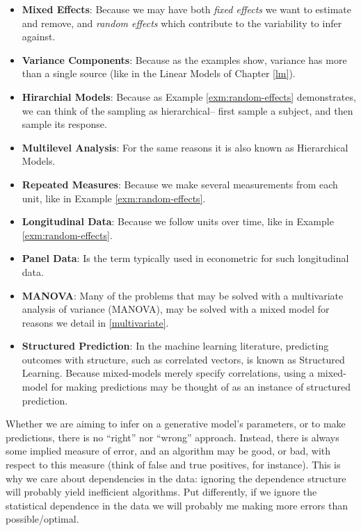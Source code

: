 \documentclass[]{book}
\theoremstyle{definition}
\theoremstyle{definition}
\theoremstyle{definition}
\theoremstyle{remark}
\begin{document}
\begin{itemize}
\item
  \textbf{Mixed Effects}: Because we may have both \emph{fixed effects}
  we want to estimate and remove, and \emph{random effects} which
  contribute to the variability to infer against.
\item
  \textbf{Variance Components}: Because as the examples show, variance
  has more than a single source (like in the Linear Models of Chapter
  \ref{lm}).
\item
  \textbf{Hirarchial Models}: Because as Example
  \ref{exm:random-effects} demonstrates, we can think of the sampling as
  hierarchical-- first sample a subject, and then sample its response.
\item
  \textbf{Multilevel Analysis}: For the same reasons it is also known as
  Hierarchical Models.
\item
  \textbf{Repeated Measures}: Because we make several measurements from
  each unit, like in Example \ref{exm:random-effects}.
\item
  \textbf{Longitudinal Data}: Because we follow units over time, like in
  Example \ref{exm:random-effects}.
\item
  \textbf{Panel Data}: Is the term typically used in econometric for
  such longitudinal data.
\item
  \textbf{MANOVA}: Many of the problems that may be solved with a
  multivariate analysis of variance (MANOVA), may be solved with a mixed
  model for reasons we detail in \ref{multivariate}.
\item
  \textbf{Structured Prediction}: In the machine learning literature,
  predicting outcomes with structure, such as correlated vectors, is
  known as Structured Learning. Because mixed-models merely specify
  correlations, using a mixed-model for making predictions may be
  thought of as an instance of structured prediction.
\end{itemize}

Whether we are aiming to infer on a generative model's parameters, or to
make predictions, there is no ``right'' nor ``wrong'' approach. Instead,
there is always some implied measure of error, and an algorithm may be
good, or bad, with respect to this measure (think of false and true
positives, for instance). This is why we care about dependencies in the
data: ignoring the dependence structure will probably yield inefficient
algorithms. Put differently, if we ignore the statistical dependence in
the data we will probably me making more errors than possible/optimal.
\end{document}
